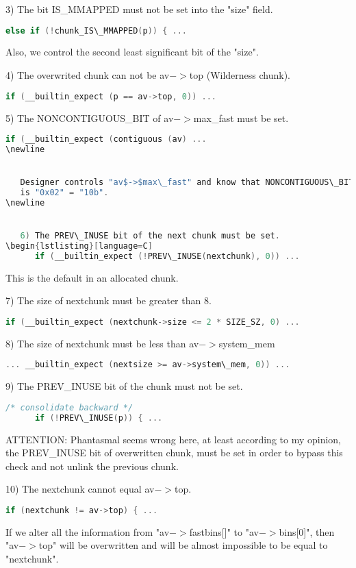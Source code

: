 \documentclass[12pt]{article}
\begin{document}
   3) The bit IS\_MMAPPED must not be set into the "size" field.
\begin{lstlisting}[language=C]
      else if (!chunk_IS\_MMAPPED(p)) { ...
\end{lstlisting}
      Also, we control the second least significant bit of the "size".
\newline


   4) The overwrited chunk can not be av$->$top (Wilderness chunk).
\begin{lstlisting}[language=C]
      if (__builtin_expect (p == av->top, 0)) ...
\end{lstlisting}
   5) The NONCONTIGUOUS\_BIT of av$->$max\_fast must be set.
\begin{lstlisting}[language=C]
      if (__builtin_expect (contiguous (av) ...
\newline


   Designer controls "av$->$max\_fast" and know that NONCONTIGUOUS\_BIT
   is "0x02" = "10b".
\newline


   6) The PREV\_INUSE bit of the next chunk must be set.
\begin{lstlisting}[language=C]
      if (__builtin_expect (!PREV\_INUSE(nextchunk), 0)) ...
\end{lstlisting}
      This is the default in an allocated chunk.
\newline


   7) The size of nextchunk must be greater than 8.
\begin{lstlisting}[language=C]
      if (__builtin_expect (nextchunk->size <= 2 * SIZE_SZ, 0) ...
\end{lstlisting}
   8) The size of nextchunk must be less than av$->$system\_mem
\begin{lstlisting}[language=C]
      ... __builtin_expect (nextsize >= av->system\_mem, 0)) ...
\end{lstlisting}
   9) The PREV\_INUSE bit of the chunk must not be set.
\begin{lstlisting}[language=C]
      /* consolidate backward */
      if (!PREV\_INUSE(p)) { ...
\end{lstlisting}

      ATTENTION: Phantasmal seems wrong here, at least according to my
                 opinion, the PREV\_INUSE bit of overwritten chunk, must
                 be set in order to bypass this check and not unlink the
                 previous chunk.

  10) The nextchunk cannot equal av$->$top.
\begin{lstlisting}[language=C]
      if (nextchunk != av->top) { ...
\end{lstlisting}
      If we alter all the information from "av$->$fastbins[]" to
      "av$->$bins[0]", then "av$->$top" will be overwritten and will
      be almost impossible to be equal to "nextchunk".
\newline
\end{document}
